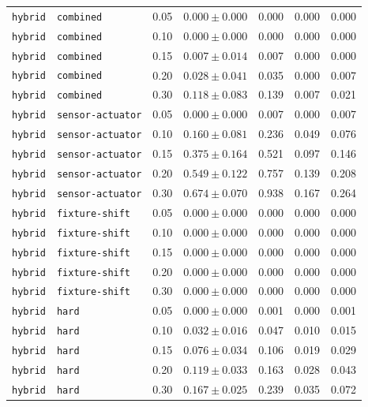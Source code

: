\documentclass{article}
\begin{document}
\begin{center}
\begin{tabular}{lllcccc}
\texttt{hybrid} & \texttt{combined} & 0.05 & $0.000 \pm 0.000$ & 0.000 & 0.000 & 0.000 \\
\texttt{hybrid} & \texttt{combined} & 0.10 & $0.000 \pm 0.000$ & 0.000 & 0.000 & 0.000 \\
\texttt{hybrid} & \texttt{combined} & 0.15 & $0.007 \pm 0.014$ & 0.007 & 0.000 & 0.000 \\
\texttt{hybrid} & \texttt{combined} & 0.20 & $0.028 \pm 0.041$ & 0.035 & 0.000 & 0.007 \\
\texttt{hybrid} & \texttt{combined} & 0.30 & $0.118 \pm 0.083$ & 0.139 & 0.007 & 0.021 \\
\texttt{hybrid} & \texttt{sensor-actuator} & 0.05 & $0.000 \pm 0.000$ & 0.007 & 0.000 & 0.007 \\
\texttt{hybrid} & \texttt{sensor-actuator} & 0.10 & $0.160 \pm 0.081$ & 0.236 & 0.049 & 0.076 \\
\texttt{hybrid} & \texttt{sensor-actuator} & 0.15 & $0.375 \pm 0.164$ & 0.521 & 0.097 & 0.146 \\
\texttt{hybrid} & \texttt{sensor-actuator} & 0.20 & $0.549 \pm 0.122$ & 0.757 & 0.139 & 0.208 \\
\texttt{hybrid} & \texttt{sensor-actuator} & 0.30 & $0.674 \pm 0.070$ & 0.938 & 0.167 & 0.264 \\
\texttt{hybrid} & \texttt{fixture-shift} & 0.05 & $0.000 \pm 0.000$ & 0.000 & 0.000 & 0.000 \\
\texttt{hybrid} & \texttt{fixture-shift} & 0.10 & $0.000 \pm 0.000$ & 0.000 & 0.000 & 0.000 \\
\texttt{hybrid} & \texttt{fixture-shift} & 0.15 & $0.000 \pm 0.000$ & 0.000 & 0.000 & 0.000 \\
\texttt{hybrid} & \texttt{fixture-shift} & 0.20 & $0.000 \pm 0.000$ & 0.000 & 0.000 & 0.000 \\
\texttt{hybrid} & \texttt{fixture-shift} & 0.30 & $0.000 \pm 0.000$ & 0.000 & 0.000 & 0.000 \\
\texttt{hybrid} & \texttt{hard} & 0.05 & $0.000 \pm 0.000$ & 0.001 & 0.000 & 0.001 \\
\texttt{hybrid} & \texttt{hard} & 0.10 & $0.032 \pm 0.016$ & 0.047 & 0.010 & 0.015 \\
\texttt{hybrid} & \texttt{hard} & 0.15 & $0.076 \pm 0.034$ & 0.106 & 0.019 & 0.029 \\
\texttt{hybrid} & \texttt{hard} & 0.20 & $0.119 \pm 0.033$ & 0.163 & 0.028 & 0.043 \\
\texttt{hybrid} & \texttt{hard} & 0.30 & $0.167 \pm 0.025$ & 0.239 & 0.035 & 0.072 \\

\end{tabular}
\end{center}
\end{document}
